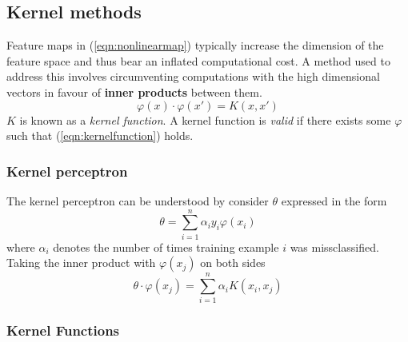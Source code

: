 \documentclass{article}
\theoremstyle{definition}
\theoremstyle{remark}
\begin{document}
\subsection{Kernel methods}
Feature maps in (\ref{eqn:nonlinearmap}) typically increase the dimension of the feature space and thus bear an inflated computational cost.
A method used to address this involves circumventing computations with the high dimensional vectors in favour of \textbf{inner products} between them.  
\begin{equation}
  	\varphi(x)\cdot\varphi(x') = K(x, x')
  \label{eqn:kernelfunction}
\end{equation}
$K$ is known as a \textit{kernel function}. A kernel function is \textit{valid} if there exists some $\varphi$ such that (\ref{eqn:kernelfunction}) holds.

\subsubsection{Kernel perceptron}
The kernel perceptron can be understood by consider $\theta$ expressed in the form 
\begin{equation}
  \theta = \sum_{i=1}^{n}\alpha_{i}y_{i}\varphi(x_{i})
  \label{eqn:kernelperceptron}
\end{equation}
where $\alpha_{i}$ denotes the number of times training example $i$ was missclassified.
Taking the inner product with $\varphi(x_{j})$ on both sides
\begin{equation}
  \theta\cdot\varphi(x_{j}) = \sum_{i=1}^{n} \alpha_{i}K(x_{i}, x_{j})
  \label{eqn:kernelform}
\end{equation}

\subsubsection{Kernel Functions}
\end{document}
